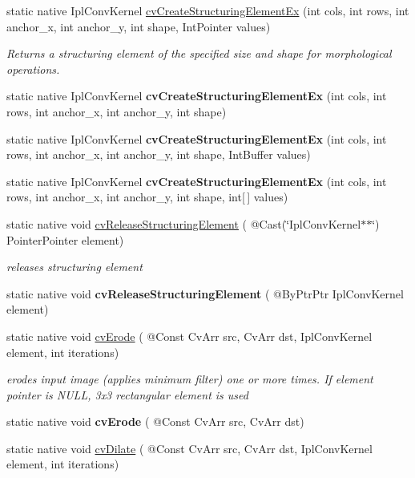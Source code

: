 \begin{DoxyCompactItemize}
\item 
static native Ipl\+Conv\+Kernel \hyperlink{group__imgproc__c_ga8a9b8019d4c181721e0f3fbb6c87cb42}{cv\+Create\+Structuring\+Element\+Ex} (int cols, int rows, int anchor\+\_\+x, int anchor\+\_\+y, int shape, Int\+Pointer values)
\begin{DoxyCompactList}\small\item\em Returns a structuring element of the specified size and shape for morphological operations. \end{DoxyCompactList}\item 
static native Ipl\+Conv\+Kernel {\bfseries cv\+Create\+Structuring\+Element\+Ex} (int cols, int rows, int anchor\+\_\+x, int anchor\+\_\+y, int shape)
\item 
static native Ipl\+Conv\+Kernel {\bfseries cv\+Create\+Structuring\+Element\+Ex} (int cols, int rows, int anchor\+\_\+x, int anchor\+\_\+y, int shape, Int\+Buffer values)
\item 
static native Ipl\+Conv\+Kernel {\bfseries cv\+Create\+Structuring\+Element\+Ex} (int cols, int rows, int anchor\+\_\+x, int anchor\+\_\+y, int shape, int\mbox{[}$\,$\mbox{]} values)
\item 
static native void \hyperlink{group__imgproc__c_gaddb6b08638fde5f3641e96a7b033f774}{cv\+Release\+Structuring\+Element} ( @Cast(\char`\"{}Ipl\+Conv\+Kernel$\ast$$\ast$\char`\"{}) Pointer\+Pointer element)
\begin{DoxyCompactList}\small\item\em releases structuring element \end{DoxyCompactList}\item 
static native void {\bfseries cv\+Release\+Structuring\+Element} ( @By\+Ptr\+Ptr Ipl\+Conv\+Kernel element)
\item 
static native void \hyperlink{group__imgproc__c_ga8b958e2b5185910eba9b44400bb1d3b8}{cv\+Erode} ( @Const Cv\+Arr src, Cv\+Arr dst, Ipl\+Conv\+Kernel element, int iterations)
\begin{DoxyCompactList}\small\item\em erodes input image (applies minimum filter) one or more times. If element pointer is N\+U\+LL, 3x3 rectangular element is used \end{DoxyCompactList}\item 
static native void {\bfseries cv\+Erode} ( @Const Cv\+Arr src, Cv\+Arr dst)
\item 
static native void \hyperlink{group__imgproc__c_gae80f82cb5e9876985e59aec2267f7ad4}{cv\+Dilate} ( @Const Cv\+Arr src, Cv\+Arr dst, Ipl\+Conv\+Kernel element, int iterations)
$$
\end{DoxyCompactItemize}
